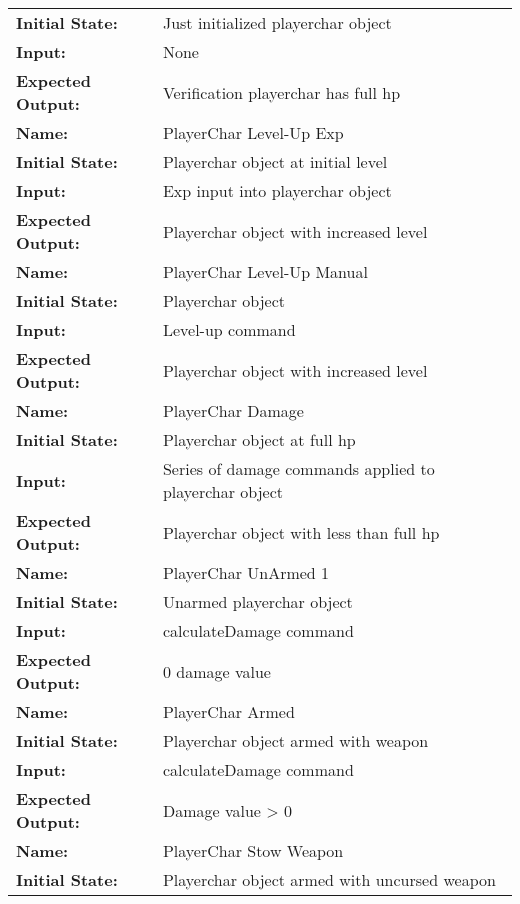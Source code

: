 \documentclass[12pt, titlepage]{article}
\begin{document}
\begin{center}
\begin{longtable}{ l | p{10cm} }
				\textbf{Initial State:} & Just initialized playerchar object\\
				\textbf{Input:} & None\\
				\textbf{Expected Output:} & Verification playerchar has full hp\\[0.6em]
				\hline
				\rule{0pt}{1.5em}\textbf{Name:} & PlayerChar Level-Up Exp\\
				\textbf{Initial State:} & Playerchar object at initial level\\
				\textbf{Input:} & Exp input into playerchar object\\
				\textbf{Expected Output:} & Playerchar object with increased level\\[0.6em]
				\hline
				\rule{0pt}{1.5em}\textbf{Name:} & PlayerChar Level-Up Manual\\
				\textbf{Initial State:} & Playerchar object\\
				\textbf{Input:} & Level-up command\\
				\textbf{Expected Output:} & Playerchar object with increased level\\[0.6em]
				\hline
				\rule{0pt}{1.5em}\textbf{Name:} & PlayerChar Damage\\
				\textbf{Initial State:} & Playerchar object at full hp\\
				\textbf{Input:} & Series of damage commands applied to playerchar object\\
				\textbf{Expected Output:} & Playerchar object with less than full hp\\[0.6em]
				\hline
				\rule{0pt}{1.5em}\textbf{Name:} & PlayerChar UnArmed 1\\
				\textbf{Initial State:} & Unarmed playerchar object\\
				\textbf{Input:} & calculateDamage command\\
				\textbf{Expected Output:} & 0 damage value\\[0.6em]
				\hline
				\rule{0pt}{1.5em}\textbf{Name:} & PlayerChar Armed\\
				\textbf{Initial State:} & Playerchar object armed with weapon\\
				\textbf{Input:} & calculateDamage command\\
				\textbf{Expected Output:} & Damage value > 0\\[0.6em]
				\hline
				\rule{0pt}{1.5em}\textbf{Name:} & PlayerChar Stow Weapon\\
				\textbf{Initial State:} & Playerchar object armed with uncursed weapon\\

\end{longtable}
\end{center}
\end{document}
